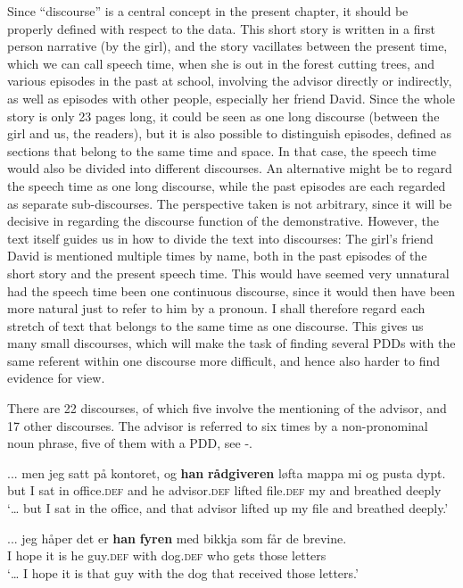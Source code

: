 \documentclass[output=paper,colorlinks,citecolor=brown]{langscibook}
\begin{document}
Since “discourse” is a central concept in the present chapter, it should be properly defined with respect to the data. This short story is written in a first person narrative (by the girl), and the story vacillates between the present time, which we can call speech time, when she is out in the forest cutting trees, and various episodes in the past at school, involving the advisor directly or indirectly, as well as episodes with other people, especially her friend David. Since the whole story is only 23 pages long, it could be seen as one long discourse (between the girl and us, the readers), but it is also possible to distinguish episodes, defined as sections that belong to the same time and space. In that case, the speech time would also be divided into different discourses. An alternative might be to regard the speech time as one long discourse, while the past episodes are each regarded as separate sub-discourses. The perspective taken is not arbitrary, since it will be decisive in regarding the discourse function of the demonstrative. However, the text itself guides us in how to divide the text into discourses: The girl’s friend David is mentioned multiple times by name, both in the past episodes of the short story and the present speech time. This would have seemed very unnatural had the speech time been one continuous discourse, since it would then have been more natural just to refer to him by a pronoun. I shall therefore regard each stretch of text that belongs to the same time as one discourse. This gives us many small discourses, which will make the task of finding several PDDs with the same referent within one discourse more difficult, and hence also harder to find evidence for  view.

There are 22 discourses, of which five involve the mentioning of the advisor, and 17 other discourses. The advisor is referred to six times by a non-pronominal noun phrase, five of them with a PDD, see -.

\ea\label{ex:johannessen:10}
 \gll ... men jeg satt på kontoret, og \textbf{han} \textbf{rådgiveren} løfta mappa mi og pusta dypt.\\
     {} but I sat in office.\textsc{def} and he advisor.\textsc{def} lifted file.\textsc{def} my and breathed deeply\\
\glt ‘… but I sat in the office, and that advisor lifted up my file and breathed deeply.’ \citep[186, top]{Rishoi2014}
\z

\ea\label{ex:johannessen:11}
 \gll ... jeg håper det er \textbf{han} \textbf{fyren} med bikkja som får de brevine.\\
     {} I hope it is he guy.\textsc{def} with dog.\textsc{def} who gets those letters\\
\glt ‘… I hope it is that guy with the dog that received those letters.’ \citep[187, bottom]{Rishoi2014}
\z
\end{document}
